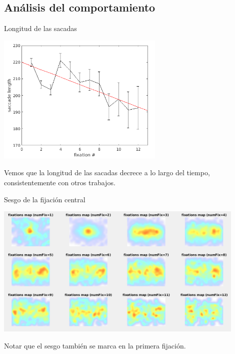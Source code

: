 \documentclass[compress]{beamer}
\begin{document}
\subsection{Análisis del comportamiento}

\begin{frame}{Longitud de las sacadas}
\begin{center}
\includegraphics[width=0.6\textwidth]{images/mean-sacclen.png}
\end{center}

Vemos que la longitud de las sacadas decrece a lo largo del tiempo, consistentemente con otros trabajos.
\end{frame}

\begin{frame}{Sesgo de la fijación central}
\begin{center}
\includegraphics[width=0.9\textwidth]{images/heatmap-per-fix.png}
\end{center}

Notar que el sesgo también se marca en la primera fijación. \end{frame}


\end{document}
